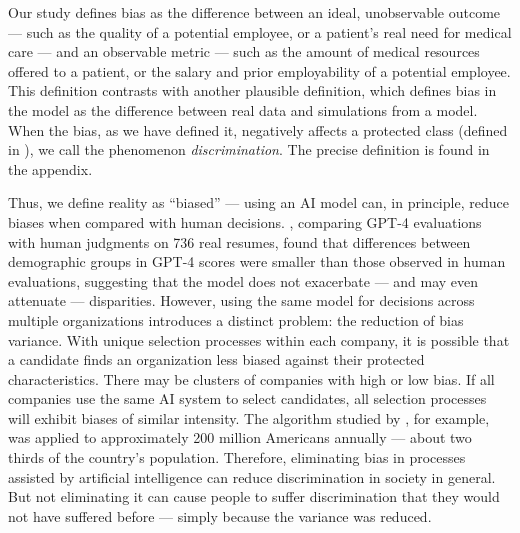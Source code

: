 \documentclass[12pt,a4paper]{article}
\begin{document}
Our study defines bias as the difference between an ideal, unobservable outcome --- such as the quality of a potential employee, or a patient's real need for medical care --- and an observable metric --- such as the amount of medical resources offered to a patient, or the salary and prior employability of a potential employee. This definition contrasts with another plausible definition, which defines bias in the model as the difference between real data and simulations from a model. When the bias, as we have defined it, negatively affects a protected class
(defined in \citealp{heymann2021}), we call the phenomenon
\textit{discrimination}. The precise definition is found in the appendix.

Thus, we define reality as ``biased'' --- using an AI model can, in principle, reduce biases when compared with human decisions. \citet{vaishampayan2025}, comparing GPT-4 evaluations with human judgments on 736 real resumes, found that differences between demographic groups in GPT-4 scores were smaller than those observed in human evaluations, suggesting that the model does not exacerbate --- and may even attenuate --- disparities. However, using the same model for decisions across multiple organizations introduces a distinct problem: the reduction of bias variance. With unique selection processes within each company, it is possible that a candidate finds an organization less biased against their protected characteristics. There may be clusters of companies with high or low bias. If all companies use the same AI system to select candidates, all selection processes will exhibit biases of similar intensity. The algorithm studied by \citet{obermeyer2019},
for example, was applied to approximately 200 million Americans annually --- about two thirds of the country's population. Therefore, eliminating bias in processes assisted by artificial intelligence can reduce discrimination in society in general. But not eliminating it can cause people to suffer discrimination that they would not have suffered before ---
simply because the variance was reduced.
\end{document}
